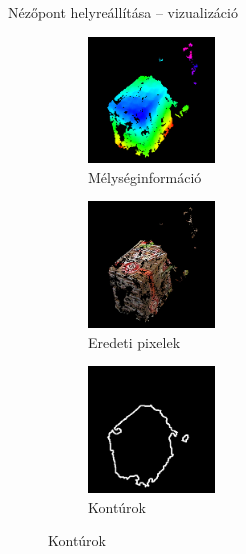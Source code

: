 \begin{frame}{Nézőpont helyreállítása -- vizualizáció}

\vspace{20pt}
\begin{figure}
\centering
\begin{subfigure}[b]{.32\linewidth}
	\centering
	\includegraphics[width=95pt]{figures/visu_depth.png}
	\caption{Mélységinformáció}
  \end{subfigure}
\begin{subfigure}[b]{.32\linewidth}
	\centering
	\includegraphics[width=95pt]{figures/visu_pixels.png}
	\caption{Eredeti pixelek}
  \end{subfigure}
\begin{subfigure}[b]{.32\linewidth}
	\centering
	\includegraphics[width=95pt]{figures/visu_contours.png}
	\caption{Kontúrok}
  \end{subfigure}
\end{figure}

\end{frame}

